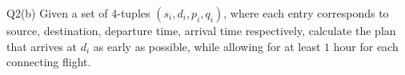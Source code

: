 \begin{problem}
  {Q2(b)}
  Given a set of 4-tuples $(s_i, d_i, p_i, q_i)$, where each entry corresponds to source, destination, departure time, arrival time respectively, calculate
  the plan that arrives at $d_i$ as early as possible, while allowing for at least $1$ hour for each connecting flight. \\
\end{problem}
